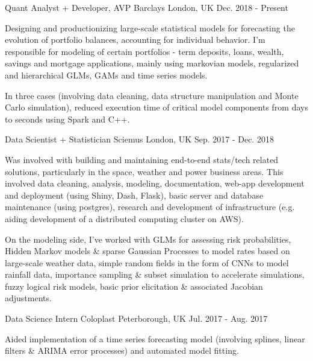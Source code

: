 

\begin{cventries}

  \cventry
    {Quant Analyst + Developer, AVP} %
    {Barclays} %
    {London, UK} %
    {Dec. 2018 - Present} %
    {
      \begin{cvitems} %
        \item {Designing and productionizing large-scale statistical models for forecasting the evolution of portfolio balances, accounting for individual behavior. I'm responsible for modeling of certain portfolios - term deposits, loans, wealth, savings and mortgage applications, mainly using markovian models, regularized and hierarchical GLMs, GAMs and time series models.}
        \item {In three cases (involving data cleaning, data structure manipulation and Monte Carlo simulation), reduced execution time of critical model components from days to seconds using Spark and C++.}
      \end{cvitems}
    }

  \cventry
    {Data Scientist + Statistician} %
    {Sciemus} %
    {London, UK} %
    {Sep. 2017 - Dec. 2018} %
    {
      \begin{cvitems} %
        \item {Was involved with building and maintaining end-to-end stats/tech related solutions, particularly in the space, weather and power business areas. This involved data cleaning, analysis, modeling, documentation, web-app development and deployment (using Shiny, Dash, Flask), basic server and database maintenance (using postgres), research and development of infrastructure (e.g. aiding development of a distributed computing cluster on AWS).}
        \item {On the modeling side, I’ve worked with GLMs for assessing risk probabilities, Hidden Markov models \& sparse Gaussian Processes to model rates based on large-scale weather data, simple random fields in the form of CNNs to model rainfall data, importance sampling \& subset simulation to accelerate simulations, fuzzy logical risk models, basic prior elicitation \& associated Jacobian adjustments.}
      \end{cvitems}
    }

  \cventry
    {Data Science Intern} %
    {Coloplast} %
    {Peterborough, UK} %
    {Jul. 2017 - Aug. 2017} %
    {
      \begin{cvitems} %
        \item {Aided implementation of a time series forecasting model (involving splines, linear filters \& ARIMA error processes) and automated model fitting.}
      \end{cvitems}
    }


\end{cventries}
